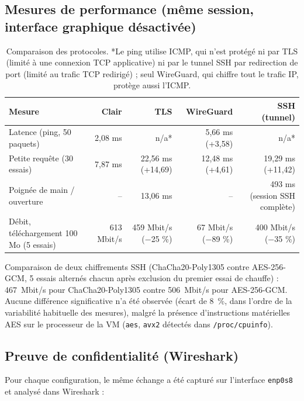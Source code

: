 \documentclass[11pt,a4paper]{article}
\begin{document}
\subsection{Mesures de performance (même session, interface graphique désactivée)}

\begin{table}[H]
\centering
\begin{tabularx}{\textwidth}{Y r r r r}
\toprule
\textbf{Mesure} & \textbf{Clair} & \textbf{TLS} & \textbf{WireGuard} & \textbf{SSH (tunnel)} \\
\midrule
Latence (ping, 50 paquets) & 2,08 ms & n/a* & 5,66 ms (+3,58) & n/a* \\
Petite requête (30 essais) & 7,87 ms & 22,56 ms (+14,69) & 12,48 ms (+4,61) & 19,29 ms (+11,42) \\
Poignée de main / ouverture & -- & 13,06 ms & -- & 493 ms (session SSH complète) \\
Débit, téléchargement 100 Mo (5 essais) & 613 Mbit/s & 459 Mbit/s (−25 \%) & 67 Mbit/s (−89 \%) & 400 Mbit/s (−35 \%) \\
\bottomrule
\end{tabularx}
\caption{Comparaison des protocoles. *Le ping utilise ICMP, qui n'est protégé ni par TLS
(limité à une connexion TCP applicative) ni par le tunnel SSH par redirection de port (limité au
trafic TCP redirigé) ; seul WireGuard, qui chiffre tout le trafic IP, protège aussi l'ICMP.}
\end{table}

Comparaison de deux chiffrements SSH (ChaCha20-Poly1305 contre AES-256-GCM, 5 essais alternés
chacun après exclusion du premier essai de chauffe) : 467~Mbit/s pour ChaCha20-Poly1305 contre
506~Mbit/s pour AES-256-GCM. Aucune différence significative n'a été observée (écart de 8~\%, dans
l'ordre de la variabilité habituelle des mesures), malgré la présence d'instructions matérielles
AES sur le processeur de la VM (\texttt{aes}, \texttt{avx2} détectés dans \texttt{/proc/cpuinfo}).

\subsection{Preuve de confidentialité (Wireshark)}
Pour chaque configuration, le même échange a été capturé sur l'interface \texttt{enp0s8} et analysé
dans Wireshark :
\end{document}
